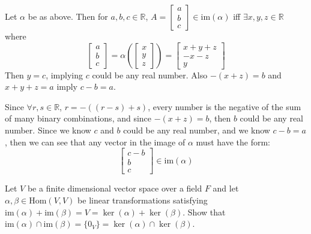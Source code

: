 \documentclass{article}
\begin{document}
\begin{solution}
Let $\alpha$ be as above. Then for $a,b,c \in \mathbb{R}$, $A = \begin{bmatrix}
a\\ b\\ c
\end{bmatrix} \in \text{im}(\alpha)$ iff $\exists x,y,z\in \mathbb{R}$ where 
\[
\begin{bmatrix}
a\\ b\\ c
\end{bmatrix} =
\alpha\left(
\begin{bmatrix}
x\\ y\\ z
\end{bmatrix}
\right)
= 
\begin{bmatrix}
x+y+z\\ -x-z\\ y
\end{bmatrix}
\]
Then $y=c$, implying $c$ could be any real number. Also $-(x+z)=b$ and $x+y+z = a$ imply $c-b=a$.

Since $\forall r,s\in\mathbb{R}$, $r=-((r-s)+s)$, every number is the negative of the sum of many binary combinations, and since $-(x+z)=b$, then $b$ could be any real number. Since we know $c$ and $b$ could be any real number, and we know $c-b=a$, then we can see that any vector in the image of $\alpha$ must have the form:
\[
\begin{bmatrix}
c-b\\ b\\ c
\end{bmatrix}
\in \text{im}(\alpha)
\]
\end{solution}

\renewcommand{\thesolution}{\theproblem}
\setcounter{problem}{276}
\begin{problem}
Let $V$ be a finite dimensional vector space over a field $F$ and let $\alpha,\beta \in \text{Hom}(V, V)$ be linear transformations satisfying $\text{im}(\alpha)+\text{im}(\beta) = V = \ker(\alpha) + \ker(\beta)$. Show that $\text{im}(\alpha)\cap\text{im}(\beta) = \{ 0_{V} \} = \ker(\alpha) \cap\ker(\beta)$.
\end{problem}
\end{document}
